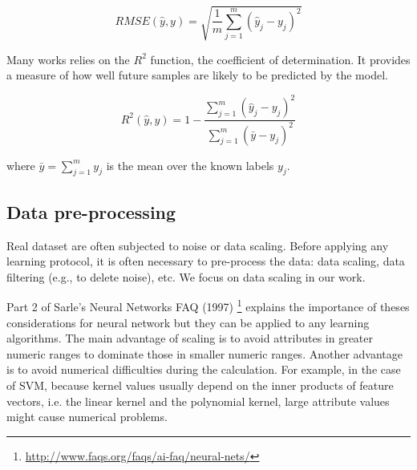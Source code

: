 \begin{equation}
RMSE(\hat{y},y) = \sqrt{\frac{1}{m} \sum_{j=1}^m(\hat{y}_j-y_j)^2}
\end{equation}

Many works relies on the $R^2$ function, the coefficient of determination. It provides a measure of how well future samples are likely to be predicted by the model.

\begin{equation}
R^2(\hat{y},y) = 1- \frac{\sum_{j=1}^m (\hat{y}_j-y_j)^2}{\sum_{j=1}^m (\bar{y}-y_j)^2}
\end{equation}

\noindent where $\bar{y} = \sum_{j=1}^m y_j$ is the mean over the known labels $y_j$.


\subsection{Data pre-processing}
Real dataset are often subjected to noise or data scaling. Before applying any learning protocol, it is often necessary to pre-process the data: data scaling, data filtering (e.g., to delete noise), etc. We focus on data scaling in our work.

Part 2 of Sarle's Neural Networks FAQ (1997) \footnote{\url{http://www.faqs.org/faqs/ai-faq/neural-nets/}} explains the importance of theses considerations for neural network but they can be applied to any learning algorithms. The main advantage of scaling is to avoid attributes in greater numeric ranges to dominate those in smaller numeric ranges. Another advantage is to avoid numerical difficulties during the calculation. For example, in the case of SVM, because kernel values usually depend on the inner products of feature vectors, i.e. the linear kernel and the polynomial kernel, large attribute values might cause numerical problems. 

